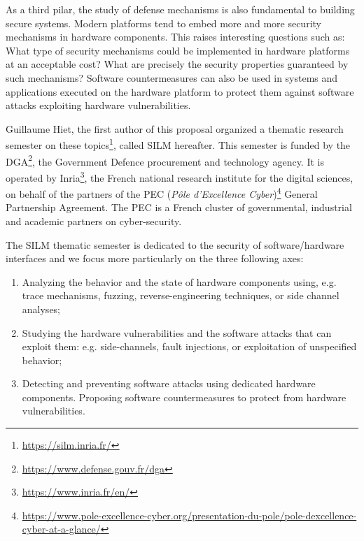 \documentclass[a4paper,11pt]{article} %
\numberwithin{equation}{section} %
\numberwithin{figure}{section} %
\numberwithin{table}{section} %
\begin{document}
As a third pilar, the study of defense mechanisms is also fundamental to
building secure systems. Modern platforms tend to embed more and more
security mechanisms in hardware components. This raises interesting
questions such as: What type of security mechanisms could be implemented in
hardware platforms at an acceptable cost? What are precisely the security
properties guaranteed by such mechanisms? Software countermeasures can also
be used in systems and applications executed on the hardware platform to
protect them against software attacks exploiting hardware vulnerabilities.

Guillaume Hiet, the first author of this proposal organized a thematic
research semester on these topics\footnote{\url{https://silm.inria.fr/}},
called SILM hereafter. This semester is funded by the
DGA\footnote{\url{https://www.defense.gouv.fr/dga}}, the Government Defence
procurement and technology agency. It is  operated by
Inria\footnote{\url{https://www.inria.fr/en/}}, the French national
research institute for the digital sciences, on behalf of the partners of
the PEC (\textit{Pôle d'Excellence
Cyber})\footnote{\url{https://www.pole-excellence-cyber.org/presentation-du-pole/pole-dexcellence-cyber-at-a-glance/}}
General Partnership Agreement. The PEC is a French cluster of governmental,
industrial and academic partners on cyber-security.

The SILM thematic semester is dedicated to the security of
software/hardware interfaces and we focus more particularly on the three
following axes:

\begin{enumerate}
%
    \item Analyzing the behavior and the state of hardware components
using, e.g. trace mechanisms, fuzzing, reverse-engineering techniques, or
side channel analyses;
%
    \item Studying the hardware vulnerabilities and the software attacks
that can exploit them: e.g. side-channels, fault injections, or
exploitation of unspecified behavior;
%
    \item Detecting and preventing software attacks using dedicated
hardware components. Proposing software countermeasures to protect from
hardware vulnerabilities.
%
\end{enumerate}
\end{document}

